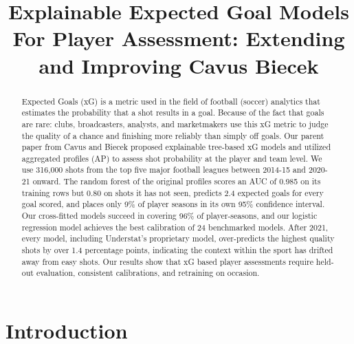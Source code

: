 \documentclass[conference]{IEEEtran}
\begin{document}
\title{Explainable Expected Goal Models For Player Assessment: Extending and Improving Cavus Biecek}

\author{
\and
{}
}

\maketitle

\begin{abstract}
Expected Goals (xG) is a metric used in the field of football (soccer) analytics that estimates the probability that a shot results in a goal. Because of the fact that goals are rare: clubs, broadcasters, analysts, and marketmakers use this xG metric to judge the quality of a chance and finishing more reliably than simply off goals. Our parent paper from Cavus and Biecek proposed explainable tree-based xG models and utilized aggregated profiles (AP) to assess shot probability at the player and team level. We use 316,000 shots from the top five major football leagues between 2014-15 and 2020-21 onward. The random forest of the original profiles scores an AUC of 0.985 on its training rows but 0.80 on shots it has not seen, predicts 2.4 expected goals for every goal scored, and places only 9\% of player seasons in its own 95\% confidence interval. Our cross-fitted models succeed in covering 96\% of player-seasons, and our logistic regression model achieves the best calibration of 24 benchmarked models. After 2021, every model, including Understat's proprietary model, over-predicts the highest quality shots by over 1.4 percentage points, indicating the context within the sport has drifted away from easy shots. Our results show that xG based player assessments require held-out evaluation, consistent calibrations, and retraining on occasion.
\end{abstract}


\section{Introduction}
\end{document}

